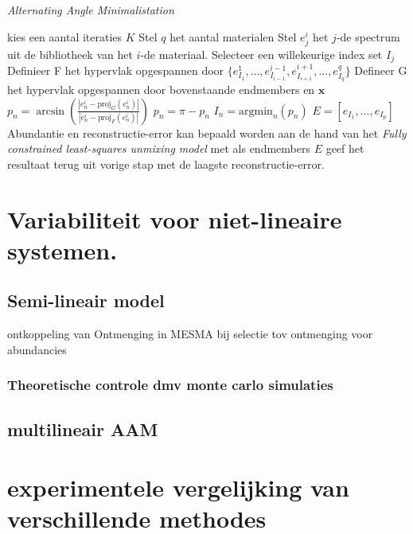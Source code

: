 \documentclass[12pt]{report}
\newcommand{\proj}[2]{\text{proj}_{#2}\left(#1\right)}
\begin{document}
\begin{algorithm}
\caption{\textit{Alternating Angle Minimalistation} \label{al:AAM}}
\begin{algorithmic}[1]
\State kies een aantal iteraties $K$
\State Stel $q$ het aantal materialen
\State Stel $e_j^i$ het $j$-de spectrum uit de bibliotheek van het $i$-de materiaal.
\State Selecteer een willekeurige index set $I_j$
\State Definieer F het hypervlak opgespannen door $\{e^1_{I_1},...,e^{i-1}_{I_{i-1}},e^{i+1}_{I_{i+1}},...,e^q_{I_q}\}$
\State Defineer G het hypervlak opgespannen door bovenstaande endmembers en $\bm{x}$
\State $p_n = \arcsin \left(\frac{\left|e^i_n - \proj{e^i_n}{G}\right|}{\left|e^i_n - \proj{e^i_n}{F}\right|}\right)$
\If {$(e^i_n - \proj{e^i_n}{F}) \dot (x - proj{x}{F}) < 0$}
\State $p_n = \pi - p_n$
\EndIf
\EndFor
\EndFor
\State $I_n = \text{argmin}_n\left(p_n\right)$
\EndFor
\State $E = [e_{I_1},...,e_{I_p}]$
\State Abundantie en reconstructie-error kan bepaald worden aan de hand van het \textit{Fully constrained
least-squares unmixing model} met als endmembers $E$
\EndFor
\State geef het resultaat terug uit vorige stap met de laagste reconstructie-error.
\end{algorithmic}
\end{algorithm}


\chapter{Variabiliteit voor niet-lineaire systemen.}

\section{Semi-lineair model}

ontkoppeling van Ontmenging in MESMA bij selectie tov ontmenging voor abundancies

\subsection{Theoretische controle dmv monte carlo simulaties}

\section{multilineair AAM}

\chapter{experimentele vergelijking van verschillende methodes}
\end{document}
